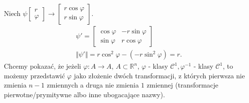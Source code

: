 \documentclass[../main.tex]{subfiles}
\begin{document}
    Niech $\psi \begin{bmatrix} r\\\varphi \end{bmatrix} \to \begin{bmatrix} r \cos \varphi\\ r \sin \varphi \end{bmatrix}  $.
    \begin{align*}
        &\psi' = \begin{bmatrix} \cos \varphi &- r \sin \varphi\\ \sin \varphi & r \cos \varphi \end{bmatrix}\\
        &\Vert \psi' \Vert = r\cos^2 \varphi - (-r\sin^2 \varphi) = r
    .\end{align*}
    Chcemy pokazać, że jeżeli $\varphi: A\to A$, $A\subset\mathbb{R}^n$, $\varphi$ - klasy $\mathcal{C}^1, \varphi^{-1}$ - klasy $\mathcal{C}^1$, to możemy przedstawić $\varphi$ jako złożenie dwóch transformacji, z których pierwsza nie zmienia $n-1$ zmiennych a druga nie zmienia $1$ zmiennej (transformacje pierwotne/prymitywne albo inne ubogacające nazwy).
\end{document}
